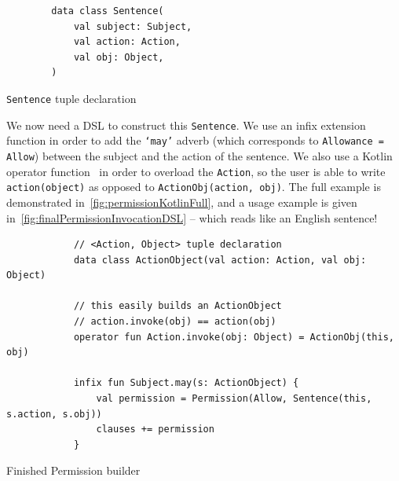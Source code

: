 \begin{listing}[h]
    \centering
    \begin{minipage}{0.4\textwidth}
        \begin{verbatim}
        data class Sentence(
            val subject: Subject,
            val action: Action,
            val obj: Object,
        )
        \end{verbatim}
    \end{minipage}
    \caption{\texttt{Sentence} tuple declaration}\label{fig:kotlinSentence}
\end{listing}

We now need a DSL to construct this \texttt{Sentence}.
We use an infix extension function in order to add the \texttt{`may'} adverb (which corresponds to \texttt{Allowance = Allow}) between the subject and the action of the sentence.
We also use a Kotlin operator function~\cite{kotlinInvokeOperator} in order to overload the \texttt{Action}, so the user is able to write \texttt{action(object)} as opposed to \texttt{ActionObj(action, obj)}.
The full example is demonstrated in~\autoref{fig:permissionKotlinFull}, and a usage example is given in~\autoref{fig:finalPermissionInvocationDSL} -- which reads like an English sentence!



\begin{listing}[h]
    \centering
    \begin{minipage}{\textwidth}
        \begin{verbatim}
            // <Action, Object> tuple declaration
            data class ActionObject(val action: Action, val obj: Object)

            // this easily builds an ActionObject
            // action.invoke(obj) == action(obj)
            operator fun Action.invoke(obj: Object) = ActionObj(this, obj)

            infix fun Subject.may(s: ActionObject) {
                val permission = Permission(Allow, Sentence(this, s.action, s.obj))
                clauses += permission
            }
        \end{verbatim}
    \end{minipage}
    \caption{Finished Permission builder}
    \label{fig:permissionKotlinFull}
\end{listing}



